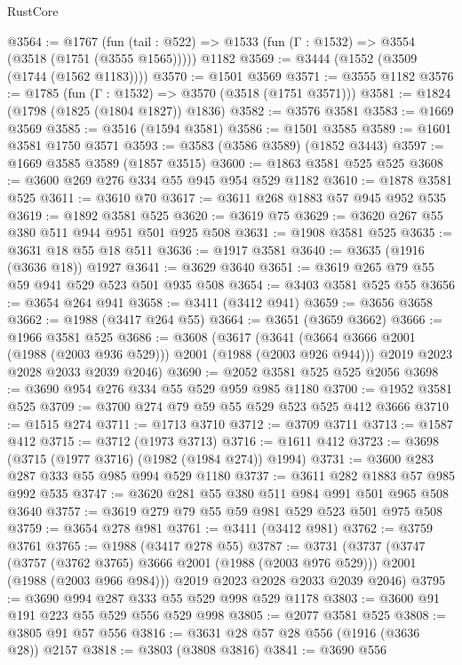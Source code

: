 \begin{lexlean}{RustCore}
\begin{coremodule}
@3564 := @1767
    (fun (tail : @522) => @1533 (fun (Γ : @1532) => @3554 (@3518 (@1751 (@3555 @1565)))))
    @1182
@3569 := @3444 (@1552 (@3509 (@1744 (@1562 @1183))))
@3570 := @1501 @3569
@3571 := @3555 @1182
@3576 := @1785 (fun (Γ : @1532) => @3570 (@3518 (@1751 @3571)))
@3581 := @1824 (@1798 (@1825 (@1804 @1827)) @1836)
@3582 := @3576 @3581
@3583 := @1669 @3569
@3585 := @3516 (@1594 @3581)
@3586 := @1501 @3585
@3589 := @1601 @3581 @1750 @3571
@3593 := @3583 (@3586 @3589) (@1852 @3443)
@3597 := @1669 @3585 @3589 (@1857 @3515)
@3600 := @1863 @3581 @525 @525
@3608 := @3600 @269 @276 @334 @55 @945 @954 @529 @1182
@3610 := @1878 @3581 @525
@3611 := @3610 @70
@3617 := @3611 @268 @1883 @57 @945 @952 @535
@3619 := @1892 @3581 @525
@3620 := @3619 @75
@3629 := @3620 @267 @55 @380 @511 @944 @951 @501 @925 @508
@3631 := @1908 @3581 @525
@3635 := @3631 @18 @55 @18 @511
@3636 := @1917 @3581
@3640 := @3635 (@1916 (@3636 @18)) @1927
@3641 := @3629 @3640
@3651 := @3619 @265 @79 @55 @59 @941 @529 @523 @501 @935 @508
@3654 := @3403 @3581 @525 @55
@3656 := @3654 @264 @941
@3658 := @3411 (@3412 @941)
@3659 := @3656 @3658
@3662 := @1988 (@3417 @264 @55)
@3664 := @3651 (@3659 @3662)
@3666 := @1966 @3581 @525
@3686 := @3608
    (@3617
      (@3641 (@3664 @3666 @2001 (@1988 (@2003 @936 @529))) @2001 (@1988 (@2003 @926 @944)))
      @2019
      @2023
      @2028
      @2033
      @2039
      @2046)
@3690 := @2052 @3581 @525 @525 @2056
@3698 := @3690 @954 @276 @334 @55 @529 @959 @985 @1180
@3700 := @1952 @3581 @525
@3709 := @3700 @274 @79 @59 @55 @529 @523 @525 @412 @3666
@3710 := @1515 @274
@3711 := @1713 @3710
@3712 := @3709 @3711
@3713 := @1587 @412
@3715 := @3712 (@1973 @3713)
@3716 := @1611 @412
@3723 := @3698 (@3715 (@1977 @3716) (@1982 (@1984 @274)) @1994)
@3731 := @3600 @283 @287 @333 @55 @985 @994 @529 @1180
@3737 := @3611 @282 @1883 @57 @985 @992 @535
@3747 := @3620 @281 @55 @380 @511 @984 @991 @501 @965 @508 @3640
@3757 := @3619 @279 @79 @55 @59 @981 @529 @523 @501 @975 @508
@3759 := @3654 @278 @981
@3761 := @3411 (@3412 @981)
@3762 := @3759 @3761
@3765 := @1988 (@3417 @278 @55)
@3787 := @3731
    (@3737
      (@3747
        (@3757 (@3762 @3765) @3666 @2001 (@1988 (@2003 @976 @529)))
        @2001
        (@1988 (@2003 @966 @984)))
      @2019
      @2023
      @2028
      @2033
      @2039
      @2046)
@3795 := @3690 @994 @287 @333 @55 @529 @998 @529 @1178
@3803 := @3600 @91 @191 @223 @55 @529 @556 @529 @998
@3805 := @2077 @3581 @525
@3808 := @3805 @91 @57 @556
@3816 := @3631 @28 @57 @28 @556 (@1916 (@3636 @28)) @2157
@3818 := @3803 (@3808 @3816)
@3841 := @3690
    @556

\end{coremodule}
\end{lexlean}
